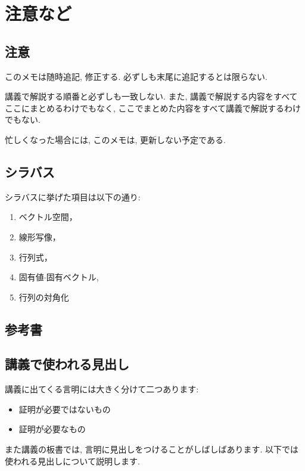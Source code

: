 \chapter*{注意など}
\section{注意}
このメモは随時追記, 修正する.
必ずしも末尾に追記するとは限らない.

講義で解説する順番と必ずしも一致しない.
また, 講義で解説する内容をすべてここにまとめるわけでもなく,
ここでまとめた内容をすべて講義で解説するわけでもない.

忙しくなった場合には,
このメモは,
更新しない予定である.

\section{シラバス}
シラバスに挙げた項目は以下の通り:
\begin{enumerate}
\item
  ベクトル空間，
\item 線形写像，
\item 行列式，
\item 固有値$\cdot$固有ベクトル,
\item 行列の対角化
\end{enumerate}

\section{参考書}



\section{講義で使われる見出し}
講義に出てくる言明には大きく分けて二つあります:
\begin{itemize}
 \item 証明が必要ではないもの
 \item 証明が必要なもの
\end{itemize}
また講義の板書では,
言明に見出しをつけることがしばしばあります.
以下では使われる見出しについて説明します.
